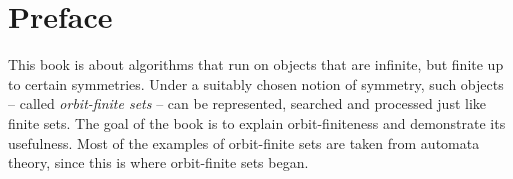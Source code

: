 \chapter*{Preface}

This book is about algorithms that run on objects that are infinite, but finite up to certain symmetries.
Under a suitably chosen notion of symmetry, such objects -- called \emph{orbit-finite sets} -- can be represented, searched and processed just like finite sets. The goal of the book is to explain orbit-finiteness and demonstrate its usefulness. Most of the examples of orbit-finite sets are taken from automata theory, since this is where orbit-finite sets began. 
